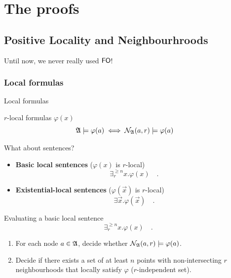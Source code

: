 \documentclass{beamer}
\begin{document}
\section{The proofs}\label{the-proofs}

\subsection{Positive Locality and Neighbourhroods}

\begin{frame}[standout]
    Until now, we never really used $\mathsf{FO}$!
\end{frame}

\subsubsection{Local formulas}\label{local-formulas}

\begin{frame}{Local formulas}
    \begin{block}{$r$-local formulas $\varphi(x)$}
        \begin{equation*}
            \mathfrak{A} \models \varphi(a)
            \iff
            \mathcal{N}_{\mathfrak{A}}(a, r) \models \varphi(a)
            \quad
        \end{equation*}
    \end{block}
    \pause
    \begin{alertblock}{What about sentences?}
        \vspace{0.1em}
        \begin{itemize}
            \item \textbf{Basic local sentences} \cite{GAIF82}
                ($\varphi(x)$ is $r$-local)
        \begin{equation*}
            \exists^{\geq n}_{r} x. \varphi(x) \quad .
        \end{equation*}
    \item \textbf{Existential-local sentences} ($\varphi(\vec{x})$ is $r$-local)
        \begin{equation*}
            \exists \vec{x}. \varphi(\vec{x}) \quad .
        \end{equation*}
        \end{itemize}
    \end{alertblock}
\end{frame}

\begin{frame}{Evaluating a basic local sentence}
    \begin{equation*}
            \exists^{\geq n}_{r} x. \varphi(x) \quad .
    \end{equation*}
    \begin{enumerate}
        \item For each node $a \in \mathfrak{A}$, decide whether
            $\mathcal{N}_{\mathfrak{A}}(a, r) \models \varphi(a)$.
        \item Decide if there exists a set of at least $n$ points
            with non-intersecting $r$ neighbourhoods that 
            locally satisfy $\varphi$
            ($r$-independent set).
    \end{enumerate}
\end{frame}
\end{document}
